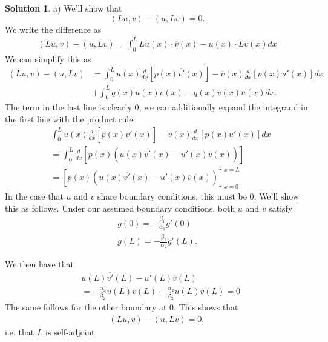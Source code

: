 \documentclass[12pt]{article}
\theoremstyle{definition}
\newtheorem{sol}{Solution}
\theoremstyle{remark}
\begin{document}
\begin{sol}
    a) We'll show that 
    \begin{equation*}
        (Lu, v) - (u, Lv) = 0.
    \end{equation*}
We write the difference as
\begin{align*}
  (Lu, v) - (u, Lv) =  \int_{0}^{L} Lu(x) \cdot \overline{v}(x) - u(x) \cdot \overline{Lv}(x) dx 
\end{align*}
We can simplify this as
\begin{align*}
   (Lu, v) - (u, Lv)  &= \int_{0}^{L} u(x)\frac{d}{dx}\left[ p(x) \overline{v'}(x)\right] 
    - \overline{v}(x) \frac{d}{dx}\left[p(x) u'(x) \right]dx\\
    &+ \int_{0}^{L} q(x)u(x) \overline{v}(x) - q(x)\overline{v}(x) u(x) dx.
\end{align*}
The term in the last line is clearly 0, we can additionally expand the integrand in the first line with the product rule
\begin{align*}
&\int_{0}^{L} u(x)\frac{d}{dx}\left[ p(x) \overline{v'}(x)\right]      - \overline{v}(x) \frac{d}{dx}\left[p(x) u'(x) \right]dx\\
&= \int_{0}^{L} \frac{d}{dx}\left[ p(x)\left( u(x)\overline{v'}(x) - u'(x) \overline{v}(x)\right) \right] \\
&= \left[ p(x)\left( u(x)\overline{v'}(x) - u'(x) \overline{v}(x)\right) \right]_{x=0}^{x=L}
\end{align*}
In the case that $u$ and $v$ share boundary conditions, this must be 0. We'll show this as follows. Under our assumed boundary conditions, both $u$ and $v$ satisfy
\begin{align*}
    g(0) = -\frac{\beta_{1}}{\alpha_{1}} g'(0)\\
    g(L) = -\frac{\beta_{2}}{\alpha_{2}} g'(L).
\end{align*}

We then have that
\begin{align*}
   &u(L) \overline{v'}(L) - u'(L) \overline{v}(L)\\
   &= -\frac{\alpha_{2}}{\beta_{2}} u(L) \overline{v}(L) +  \frac{\alpha_{2}}{\beta_{2}} u(L) \overline{v}(L) = 0
\end{align*}
The same follows for the other boundary at 0. This shows that
\begin{align*}
    (Lu, v) - (u, Lv) = 0,
\end{align*}
i.e. that $L$ is self-adjoint.

\newpage


\end{sol}
\end{document}
